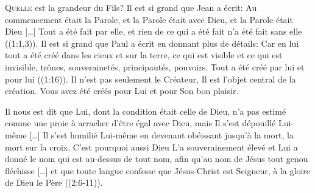 \dvrule







\lettrine{Q}{uelle} est la grandeur du Fils?
 Il est si grand que Jean a écrit: 
 \Og Au commencement était la Parole, et la Parole était avec Dieu,
 et la Parole était Dieu [\dots{}] Tout a été fait par elle,
 et rien de ce qui a été fait n'a été fait sans elle \Fg{}
 ((1:1,3)). Il est si grand que Paul a écrit en donnant
 plus de détails: 
 \Og Car en lui tout a été créé dans les cieux et sur la terre,
 ce qui est visible et ce qui est invisible, trônes, souverainetés,
 principautés, pouvoirs. Tout a été créé par lui et pour lui \Fg{}
 ((1:16)). Il n'est pas seulement le Créateur,
 Il est l'objet central de la création.
 Vous avez été créés pour Lui et pour Son bon plaisir.

Il nous est dit que \Og Lui, dont la condition était celle de Dieu,
 n'a pas estimé comme une proie à arracher d'être égal avec Dieu,
 mais Il s'est dépouillé Lui-même [\dots{}] Il s'est humilié Lui-même
 en devenant obéissant jusqu'à la mort, la mort sur la croix.
 C'est pourquoi aussi Dieu L'a souverainement élevé et Lui a donné le nom
 qui est au-dessus de tout nom, afin qu'au nom de Jésus tout genou
 fléchisse [\dots{}] et que toute langue confesse que Jésus-Christ
 est Seigneur, à la gloire de Dieu le Père \Fg{} ((2:6-11)).


\dvrule



